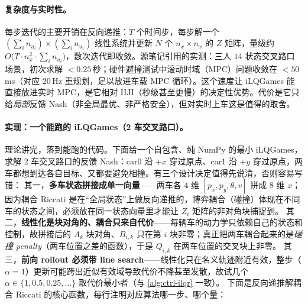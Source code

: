 \paragraph{复杂度与实时性。}
每步迭代的主要开销在反向递推：$T$ 个时间步，每步解一个 $(\sum_i n_{u_i})\times(\sum_i n_{u_i})$ 线性系统并更新 $N$ 个 $n_x\times n_x$ 的 $Z$ 矩阵，量级约 $O\big(T\cdot n_x^2\cdot\sum_i n_{u_i}\big)$，数次迭代即收敛。源笔记引用的实测：三人 $14$ 状态交叉路口场景，初次求解 $<0.25$\,秒；硬件避撞测试中滚动时域（MPC）问题收敛在 $<50$\,ms（对应 $20$\,Hz 重规划，足以放进车载 MPC 循环）\cite{fridovich2020efficient}。这个速度让 iLQGames 能直接放进实时 MPC，是它相对 HJI（秒级甚至更慢）的决定性优势。代价是它只给\emph{局部}反馈 Nash（非全局最优、非严格安全），但对实时上车这是值得的取舍。

\paragraph{实现：一个能跑的 iLQGames（2 车交叉路口）。}
理论讲完，落到能跑的代码。下面给一个自包含、纯 NumPy 的最小 iLQGames，求解 2 车交叉路口的反馈 Nash：car0 沿 $+x$ 穿过原点、car1 沿 $+y$ 穿过原点，两车都想到达各自目标、又都要避免相撞。有三个设计决定值得先说清，否则容易写错：
其一，\textbf{多车状态拼接成单一向量}——两车各 $4$ 维 $[p_x,p_y,\theta,v]$ 拼成 $8$ 维 $x$；因为耦合 Riccati 是在“全局状态”上做反向递推的，博弈耦合（碰撞）体现在不同车的状态之间，必须放在同一状态向量里才能让 $Z_i$ 矩阵的非对角块捕捉到。
其二，\textbf{线性化是块对角的、耦合只来自代价}——每辆车的动力学只依赖自己的状态和控制，故拼接后的 $A_k$ 块对角、$B_{i,k}$ 只在第 $i$ 块非零；真正把两车耦合起来的是\emph{碰撞 penalty}（两车位置之差的函数），于是 $Q_{i,k}$ 在两车位置的交叉块上非零。
其三，\textbf{前向 rollout 必须带 line search}——线性化只在名义轨迹附近有效，整步（$\alpha=1$）更新可能跨出近似有效域导致代价不降甚至发散，故试几个 $\alpha\in\{1,0.5,0.25,\dots\}$ 取代价最小者（与 \cref{alg:ctrl-ilqr} 一致）。
下面是反向递推解耦合 Riccati 的核心函数，每行注明对应算法哪一步、哪个量：

